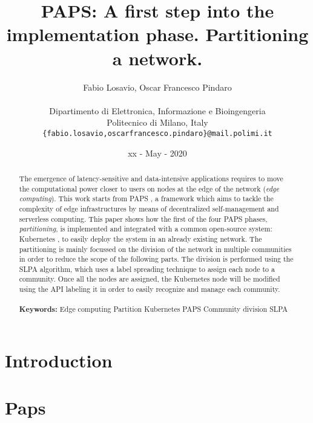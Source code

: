 \documentclass{article} %
\title{\textbf{\huge{PAPS: A first step into the implementation phase. Partitioning a network.}}}
\author{\color{black}Fabio Losavio, Oscar Francesco Pindaro \\ \\
        Dipartimento di Elettronica, Informazione e Bioingengeria \\
        Politecnico di Milano, Italy \\
        \texttt{\{fabio.losavio,oscarfrancesco.pindaro\}@mail.polimi.it}}
\date{xx - May - 2020}
\begin{document}
\maketitle

\begin{abstract}
    The emergence of latency-sensitive and data-intensive applications requires to move the 
    computational power closer to users on nodes at the edge of the network (\textit{edge computing}).
    This work starts from PAPS \cite{PAPS}, a framework which aims to tackle the complexity of edge 
    infrastructures by means of decentralized self-management and serverless computing. This paper
    shows how the first of the four PAPS phases, \textit{partitioning}, is implemented and integrated
    with a common open-source system: Kubernetes \cite{Kube}, to easily deploy the system in an already
    existing network. The partitioning is mainly focussed on the division of the network in multiple 
    communities in order to reduce the scope of the following parts. The division is performed using 
    the SLPA \cite{SLPA} algorithm, which uses a label spreading technique to assign each node to a
    community. Once all the nodes are assigned, the Kubernetes node will be modified using the API 
    labeling it in order to easily recognize and manage each community.
    \\ \\
    \textbf{Keywords:} Edge computing \textbf{\textperiodcentered} Partition 
    \textbf{\textperiodcentered} Kubernetes \textbf{\textperiodcentered} PAPS
    \textbf{\textperiodcentered} Community division \textbf{\textperiodcentered} SLPA
    
\end{abstract}
{{\section{Introduction}\label{sect:intro}}}


\clearpage
{{\section{Paps}\label{sect:paps}}}

\end{document}
